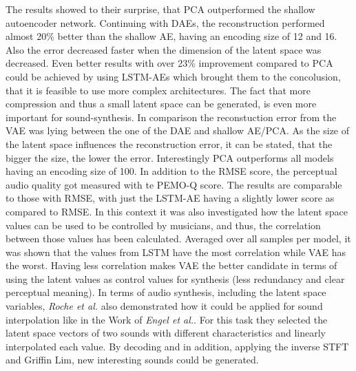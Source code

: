 The results showed to their surprise, that PCA outperformed the shallow autoencoder network. Continuing with DAEs, the reconstruction performed almost 20\% better than the shallow AE, having an encoding size of 12 and 16. Also the error decreased faster when the dimension of the latent space was decreased. Even better results with over 23\% improvement compared to PCA could be achieved by using LSTM-AEs which brought them to the concolusion, that it is feasible to use more complex architectures. The fact that more compression and thus a small latent space can be generated, is even more important for sound-synthesis. In comparison the reconstuction error from the VAE was lying between the one of the DAE and shallow AE/PCA. As the size of the latent space influences the reconstruction error, it can be stated, that the bigger the size, the lower the error. Interestingly PCA outperforms all models having an encoding size of 100. In addition to the RMSE score, the perceptual audio quality got measured with te PEMO-Q score. The results are comparable to those with RMSE, with just the LSTM-AE having a slightly lower score as compared to RMSE. In this context it was also investigated how the latent space values can be used to be controlled by musicians, and thus, the correlation between those values has been calculated. Averaged over all samples per model, it was shown that the values from LSTM have the most correlation while VAE has the worst. Having less correlation makes VAE the better candidate in terms of using the latent values as control values for synthesis (less redundancy and clear perceptual meaning). In terms of audio synthesis, including the latent space variables, \textit{Roche et al.} also demonstrated how it could be applied for sound interpolation like in the Work of \textit{Engel et al.}. For this task they selected the latent space vectors of two sounds with different characteristics and linearly interpolated each value. By decoding and in addition, applying the inverse STFT and Griffin Lim, new interesting sounds could be generated. 

